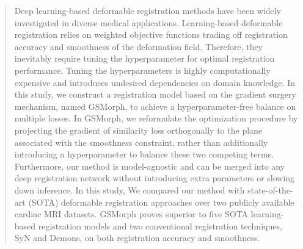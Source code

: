 \documentclass[runningheads]{llncs}
\begin{document}
%
\maketitle              %
%
\begin{abstract}
Deep learning-based deformable registration methods have been widely investigated in diverse medical applications.
Learning-based deformable registration relies on weighted objective functions trading off registration accuracy and smoothness of the deformation field. Therefore, they inevitably require tuning the hyperparameter for optimal registration performance. Tuning the hyperparameters is highly computationally expensive and introduces undesired dependencies on domain knowledge. In this study, we construct a registration model based on the gradient surgery mechanism, named GSMorph, to achieve a hyperparameter-free balance on multiple losses. In GSMorph, we reformulate the optimization procedure by projecting the gradient of similarity loss orthogonally to the plane associated with the smoothness constraint, rather than additionally introducing a hyperparameter to balance these two competing terms. Furthermore, our method is model-agnostic and can be merged into any deep registration network without introducing extra parameters or slowing down inference. In this study, We compared our method with state-of-the-art (SOTA) deformable registration approaches over two publicly available cardiac MRI datasets. GSMorph proves superior to five SOTA learning-based registration models and two conventional registration techniques, SyN and Demons, on both registration accuracy and smoothness.
\end{abstract}
%
\end{document}
